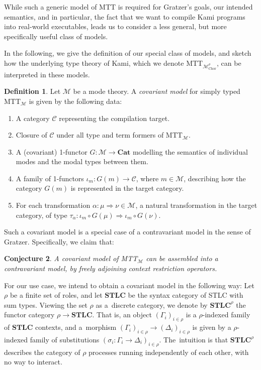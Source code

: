 \documentclass{scrartcl}
\theoremstyle{definition}
\newtheorem{definition}{Definition}
\theoremstyle{plain}
\newtheorem{conjecture}[definition]{Conjecture}
\newcommand{\modetheory}[1]{\mathcal{#1}}
\newcommand{\M}{\modetheory{M}}
\newcommand{\MrhoChor}{\M^\rho_{\textrm{Chor}}}
\newcommand{\MTTM}{MTT${}_{\M}$}
\newcommand{\MTTMrhoChor}{MTT${}_{\MrhoChor}$}
\begin{document}
While such a generic model of MTT is required for Gratzer's goals, our intended
semantics, and in particular, the fact that we want to compile Kami programs
into real-world executables, leads us to consider a less general, but more
specifically useful class of models.

In the following, we give the definition of our special class of models, and
sketch how the underlying type theory of Kami, which we denote \MTTMrhoChor,
can be interpreted in these models.
\begin{definition}
  Let $\M$ be a mode theory. A \emph{covariant model} for simply typed \MTTM{}
  is given by the following data:
  \begin{enumerate}
  \item
    A category $\mathcal{C}$ representing the compilation target.
  \item
    Closure of $\mathcal{C}$ under all type and term formers of \MTTM{}.
  \item
    A (covariant) 1-functor $G : \M \to \textbf{Cat}$ modelling the semantics
    of individual modes and the modal types between them.
  \item
    A family of 1-functors $\iota_m : G(m) \to \mathcal{C}$, where $m \in \M$,
    describing how the category $G(m)$ is represented in the target category.
  \item
    For each transformation $\alpha : \mu \Rightarrow \nu \in \M$, a natural
    transformation in the target category, of type $\tau_\alpha : \iota_m \circ
    G(\mu) \Rightarrow \iota_m \circ G(\nu)$.
  \end{enumerate}
\end{definition}
Such a covariant model is a special case of a contravariant model in the sense
of Gratzer. Specifically, we claim that:
\begin{conjecture}
  A covariant model of {\upshape \MTTM{}} can be assembled into a contravariant
  model, by freely adjoining context restriction operators.
\end{conjecture}
For our use case, we intend to obtain a covariant model in the following way:
Let $\rho$ be a finite set of roles, and let $\textbf{STLC}$ be the syntax
category of STLC with sum types. Viewing the set $\rho$ as a~discrete category,
we denote by $\textbf{STLC}^\rho$ the functor category $\rho \to
\textbf{STLC}$. That is, an object $(\Gamma_i)_{i\in\rho}$ is a $\rho$-indexed
family of $\textbf{STLC}$ contexts, and a~morphism $(\Gamma_i)_{i\in\rho} \to
(\Delta_i)_{i\in\rho}$ is given by a $\rho$-indexed family of substitutions
$(\sigma_i : \Gamma_i \to \Delta_i)_{i\in\rho}$. The~intuition is that
$\textbf{STLC}^\rho$ describes the category of $\rho$ processes running
independently of each other, with no way to interact.
\end{document}
